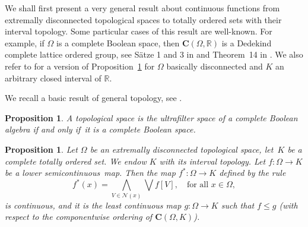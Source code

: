 \documentclass[psamsfonts,reqno]{memo-l}
\theoremstyle{plain}
\newtheorem{proposition}[lemma]{Proposition}
\theoremstyle{definition}
\theoremstyle{remark}
\numberwithin{equation}{section}
\newcommand{\Nh}{\mathcal{N}}
\renewcommand{\iff}{if and only if}
\newcommand{\CC}{\mathbf{C}}
\newcommand{\lsc}{lower semicontinuous}
\newcommand{\pup}[1]{\textup{(}{#1}\textup{)}}
\newcommand{\RR}{\mathbb{R}}
\begin{document}
We shall first present a very general result about continuous functions from
extremally disconnected topological spaces to totally ordered sets with their
interval topology. Some particular cases of this
result are well-known. For example, if $\Omega$ is a complete Boolean
space, then $\CC(\Omega,\RR)$ is a Dedekind complete
lattice ordered group, see S\"atze 1 and 3 in \cite{Naka41}
 and Theorem~14 in
\cite{Ston49}. We also refer to
\cite[Lemma~9.1]{Gpoag} for a version of
Proposition~\ref{P:ExtLsc} for $\Omega$ basically disconnected and $K$ an
arbitrary closed interval of $\RR$.

We recall a basic result of general topology, see
\cite[Theorem~10]{Halm}.

\begin{proposition}\label{P:ExtrDisc}\hfill
A topological space is the ultrafilter space of a complete Boolean
algebra \iff\ it is a complete Boolean
space.
\end{proposition}

\begin{proposition}\label{P:ExtLsc}
Let $\Omega$ be an extremally disconnected topological space, let~$K$ be a
complete totally ordered set. We endow $K$ with its
interval topology. Let
$f\colon\Omega\to K$ be a \lsc\ map. Then the map $f^*\colon\Omega\to K$
defined by the rule
   \[
   f^*(x)=\bigwedge_{V\in\Nh(x)}\bigvee f[V],\quad\text{for all }x\in\Omega,
   \]
is continuous, and it is the least continuous map $g\colon\Omega\to K$ such
that $f\leq g$ \pup{with respect to the componentwise ordering of
$\CC(\Omega,K)$}.
\end{proposition}
\end{document}
